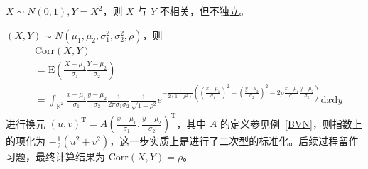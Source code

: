\documentclass[../main.tex]{subfiles}
\begin{document}
\begin{example}
    $X\sim N(0,1),Y=X^2$，则 $X$ 与 $Y$ 不相关，但不独立。
\end{example}



\begin{example}
    $(X,Y)\sim N(\mu_1,\mu_2,\sigma_1^2,\sigma_2^2,\rho)$，则
    \begin{equation}
        \begin{aligned}
             & \mathrm{Corr}(X,Y)\nonumber                                                                                                                                                                                                                                                                        \\
             & =\mathrm E(\frac{X-\mu_1}{\sigma_1}\frac{Y-\mu_2}{\sigma_2})\nonumber                                                                                                                                                                                                                              \\
             & =\int_{\mathbb R^2}\frac{x-\mu_1}{\sigma_1}\frac{y-\mu_2}{\sigma_2}\frac{1}{2\pi\sigma_1\sigma_2}\frac{1}{\sqrt{1-\rho^2}}e^{-\frac{1}{2(1-\rho^2)}((\frac{x-\mu_1}{\sigma_1})^2+(\frac{y-\mu_2}{\sigma_2})^2-2\rho\frac{x-\mu_1}{\sigma_1}\frac{y-\mu_2}{\sigma_2})}\mathrm dx\mathrm dy\nonumber
        \end{aligned}
    \end{equation}
    进行换元 $(u,v)^\mathrm T=A(\frac{x-\mu_1}{\sigma_1},\frac{y-\mu_2}{\sigma_2})^\mathrm T$，其中 $A$ 的定义参见例~\ref{BVN}，则指数上的项化为 $-\frac12(u^2+v^2)$，这一步实质上是进行了二次型的标准化。后续过程留作习题，最终计算结果为 $\mathrm{Corr}(X,Y)=\rho$。
\end{example}
\end{document}
